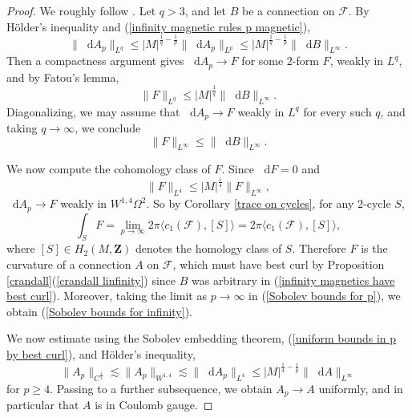 \documentclass[reqno,11pt]{amsart}
\newcommand{\ZZ}{\mathbf{Z}}
\newcommand*\dif{\mathop{}\!\mathrm{d}}
\theoremstyle{definition}
\numberwithin{equation}{section}
\begin{document}
\begin{proof}
We roughly follow \cite[\S3]{Lindqvist14}.
Let $q > 3$, and let $B$ be a connection on $\mathscr F$.
By H\"older's inequality and (\ref{infinity magnetic rules p magnetic}),
\begin{equation}\label{uniform bounds in p by best curl}
	\|\dif A_p\|_{L^q} \leq |M|^{\frac{1}{q} - \frac{1}{p}} \|\dif A_p\|_{L^p} \leq |M|^{\frac{1}{q} - \frac{1}{p}} \|\dif B\|_{L^\infty}.
\end{equation}
Then a compactness argument gives $\dif A_p \to F$ for some $2$-form $F$, weakly in $L^q$, and by Fatou's lemma, 
$$\|F\|_{L^q} \leq |M|^{\frac{1}{q}} \|\dif B\|_{L^\infty}.$$
Diagonalizing, we may assume that $\dif A_p \to F$ weakly in $L^q$ for every such $q$, and taking $q \to \infty$, we conclude 
\begin{equation}\label{infinity magnetics have best curl}
	\|F\|_{L^\infty} \leq \|\dif B\|_{L^\infty}.
\end{equation}

We now compute the cohomology class of $F$.
Since $\dif F = 0$ and
$$\|F\|_{L^4} \leq |M|^{\frac{1}{4}} \|F\|_{L^\infty},$$
$\dif A_p \to F$ weakly in $W^{1, 4} \Omega^2$.
So by Corollary \ref{trace on cycles}, for any $2$-cycle $S$,
$$\int_S F = \lim_{p \to \infty} 2\pi \langle c_1(\mathscr F), [S] \rangle = 2\pi \langle c_1(\mathscr F), [S]\rangle,$$
where $[S] \in H_2(M, \ZZ)$ denotes the homology class of $S$.
Therefore $F$ is the curvature of a connection $A$ on $\mathscr F$, which must have best curl by Proposition \ref{crandall}(\ref{crandall linfinity}) since $B$ was arbitrary in (\ref{infinity magnetics have best curl}).
Moreover, taking the limit as $p \to \infty$ in (\ref{Sobolev bounds for p}), we obtain (\ref{Sobolev bounds for infinity}).

We now estimate using the Sobolev embedding theorem, (\ref{uniform bounds in p by best curl}), and H\"older's inequality,
$$\|A_p\|_{C^{\frac{1}{4}}} \lesssim \|A_p\|_{W^{1, 4}} \lesssim \|\dif A_p\|_{L^4} \leq |M|^{\frac{1}{4} - \frac{1}{p}} \|\dif A\|_{L^\infty}$$
for $p \geq 4$.
Passing to a further subsequence, we obtain $A_p \to A$ uniformly, and in particular that $A$ is in Coulomb gauge.


\end{proof}
\end{document}
